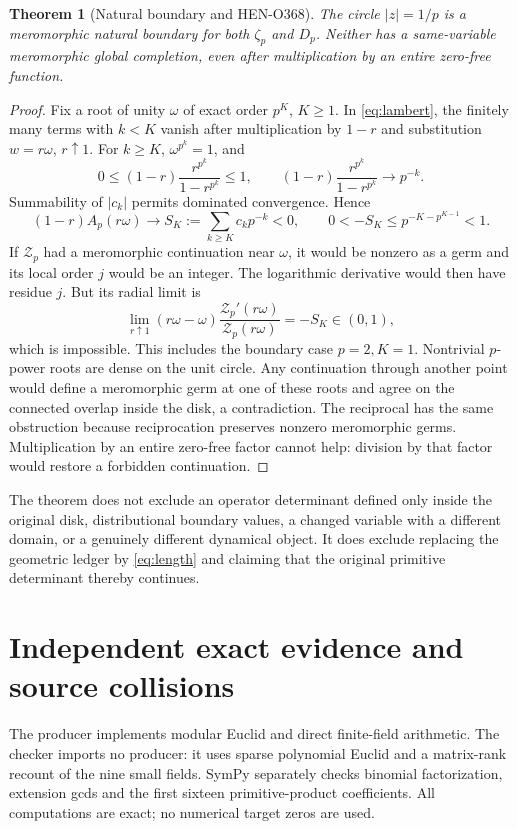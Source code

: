 \documentclass[10pt]{article}
\newtheorem{theorem}{Theorem}
\begin{document}
\begin{theorem}[Natural boundary and HEN-O368]
The circle $|z|=1/p$ is a meromorphic natural boundary for both
$\zeta_p$ and $D_p$. Neither has a same-variable meromorphic global
completion, even after multiplication by an entire zero-free function.
\end{theorem}
\begin{proof}
Fix a root of unity $\omega$ of exact order $p^K$, $K\ge1$. In
\eqref{eq:lambert}, the finitely many terms with $k<K$ vanish after
multiplication by $1-r$ and substitution $w=r\omega$, $r\uparrow1$.
For $k\ge K$, $\omega^{p^k}=1$, and
\[
 0\le(1-r)\frac{r^{p^k}}{1-r^{p^k}}\le1,
 \qquad (1-r)\frac{r^{p^k}}{1-r^{p^k}}\longrightarrow p^{-k}.
\]
Summability of $|c_k|$ permits dominated convergence. Hence
\[
 (1-r)A_p(r\omega)\longrightarrow
 S_K:=\sum_{k\ge K}c_kp^{-k}<0,
 \qquad 0<-S_K\le p^{-K-p^{K-1}}<1.
\]
If $\mathcal Z_p$ had a meromorphic continuation near $\omega$, it
would be nonzero as a germ and its local order $j$ would be an integer.
The logarithmic derivative would then have residue $j$. But its radial
limit is
\[
 \lim_{r\uparrow1}(r\omega-\omega)
 \frac{\mathcal Z_p'(r\omega)}{\mathcal Z_p(r\omega)}=-S_K\in(0,1),
\]
which is impossible. This includes the boundary case $p=2,K=1$.
Nontrivial $p$-power roots are dense on the unit circle. Any continuation
through another point would define a meromorphic germ at one of these
roots and agree on the connected overlap inside the disk, a contradiction.
The reciprocal has the same obstruction because reciprocation preserves
nonzero meromorphic germs. Multiplication by an entire zero-free factor
cannot help: division by that factor would restore a forbidden continuation.
\end{proof}

The theorem does not exclude an operator determinant defined only inside
the original disk, distributional boundary values, a changed variable with
a different domain, or a genuinely different dynamical object.
It does exclude replacing the geometric ledger by \eqref{eq:length}
and claiming that the original primitive determinant thereby continues.

\section{Independent exact evidence and source collisions}
The producer implements modular Euclid and direct finite-field arithmetic.
The checker imports no producer: it uses sparse polynomial Euclid and a
matrix-rank recount of the nine small fields. SymPy separately checks
binomial factorization, extension gcds and the first sixteen primitive-product
coefficients. All computations are exact; no numerical target zeros are used.
\end{document}

